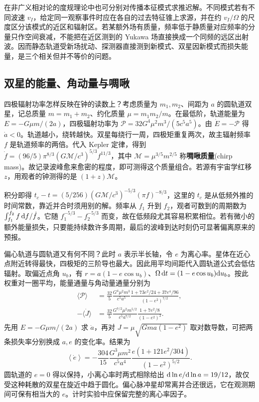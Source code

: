 在非广义相对论的度规理论中也可分别对传播本征模式求推迟解。不同模式若有不同波速 $v_I$，给定同一观察事件时应在各自的过去特征锥上求源，并在约 $v_I/\Omega$ 的尺度区分该模式的近区和辐射区。若某额外场有质量，频率低于静质量对应频率的分量只作空间衰减，不能把在近区测到的 Yukawa 场直接换成一个同频的远区出射波。因而静态轨道受新场扰动、探测器直接测到新模式、双星因新模式而损失能量，是三个相关但并不等价的问题。

\subsection{双星的能量、角动量与啁啾}

四极辐射功率怎样反映在钟的读数上？考虑质量为 $m_1,m_2$、间距为 $a$ 的圆轨道双星，记总质量 $m=m_1+m_2$、约化质量 $\mu=m_1m_2/m$。在最低阶，轨道能量为 $E=-G\mu m/(2a)$，四极辐射功率为 $\mathcal P=32G^4\mu^2m^3/(5c^5a^5)$。由 $\dot E=-\mathcal P$ 得 $\dot a<0$。轨道越小，绕转越快。双星每绕行一周，四极矩重复两次，故主辐射频率 $f$ 是轨道频率的两倍。代入 Kepler 定律，得到 $\dot f=(96/5)\pi^{8/3}(G\mathcal M/c^3)^{5/3}f^{11/3}$，其中 $\mathcal M=\mu^{3/5}m^{2/5}$ 称\textbf{啁啾质量}(chirp mass)。故记录波峰愈来愈密的程度，即可测得这个质量组合。若源有宇宙学红移 $z$，用观者的钟测得的是 $(1+z)\mathcal M$。

积分即得 $t_c-t=(5/256)(G\mathcal M/c^3)^{-5/3}(\pi f)^{-8/3}$，这里的 $t_c$ 是从低频外推的时间常数，靠近并合时须用别的解。频率从 $f_1$ 升到 $f_2$，观者可数到的周期数为 $\int_{f_1}^{f_2}f\,\dd f/\dot f$。它随 $f_1^{-5/3}-f_2^{-5/3}$ 而变，故在低频段尤其容易积累相位。若有微小的额外能量损失，只要能持续数许多周期，最后的波峰到达时刻仍可显著偏离原来的预报。

偏心轨道与圆轨道又有何不同？此时 $a$ 表示半长轴，令 $e$ 为离心率。星体在近心点附近转得最快，四极矩的三阶导也最大。因此用平均间距代入圆轨道公式会低估辐射。取偏近点角 $u_b$，有 $r=a(1-e\cos u_b)$、$\Omega\,\dd t=(1-e\cos u_b)\dd u_b$。按此权重对一圈平均，能量通量与角动量通量分别为
\begin{align*}
 \langle\mathcal P\rangle&=
 \frac{32}{5}\frac{G^4\mu^2m^3}{c^5a^5}
 \frac{1+73e^2/24+37e^4/96}{(1-e^2)^{7/2}},\\
 -\langle\dot J\rangle&=
 \frac{32}{5}\frac{G^{7/2}\mu^2m^{5/2}}{c^5a^{7/2}}
 \frac{1+7e^2/8}{(1-e^2)^2}.
\end{align*}
先用 $E=-G\mu m/(2a)$ 求 $\dot a$，再对 $J=\mu\sqrt{Gma(1-e^2)}$ 取对数导数，可把两条损失率分别换成 $a,e$ 的变化率。结果为
\[
 \left\langle\dot e\right\rangle=
 -\frac{304}{15}\frac{G^3\mu m^2}{c^5a^4}
 \frac{e(1+121e^2/304)}{(1-e^2)^{5/2}} .
\]
圆轨道的 $e=0$ 得以保持，小离心率时两式相除给出 $\dd\ln e/\dd\ln a=19/12$，故仅受这种耗散的双星在旋近中趋于圆化。偏心脉冲星却常离并合还很远，它在观测期间可保有相当大的 $e$。计时实验中应保留完整的离心率因子。

